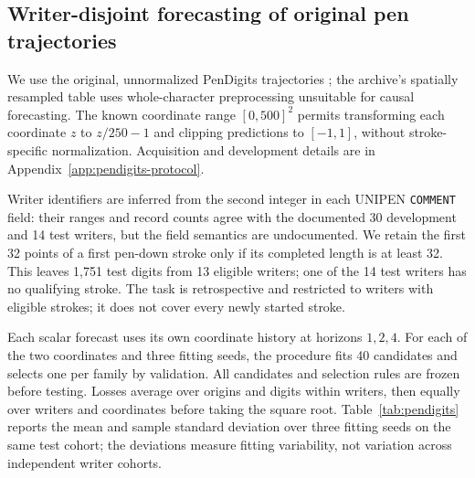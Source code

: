 \subsection{Writer-disjoint forecasting of original pen trajectories}
\label{sec:pendigits}

We use the original, unnormalized PenDigits trajectories
\citep{alpaydin1996pendigits}; the archive's spatially resampled table uses
whole-character preprocessing unsuitable for causal forecasting. The known
coordinate range $[0,500]^2$ permits transforming each coordinate $z$ to
$z/250-1$ and clipping predictions to $[-1,1]$, without stroke-specific normalization.
Acquisition and development details are in Appendix~\ref{app:pendigits-protocol}.

Writer identifiers are inferred from the second integer in each UNIPEN
\texttt{COMMENT} field: their ranges and record counts agree with the
documented 30 development and 14 test writers, but the field semantics are
undocumented. We retain the first 32 points of a first pen-down stroke only
if its completed length is at least 32. This leaves 1,751 test digits from
13 eligible writers; one of the 14 test writers has no qualifying stroke.
The task is retrospective and restricted to writers with eligible strokes;
it does not cover every newly started stroke.

Each scalar forecast uses its own coordinate history at horizons $1,2,4$.
For each of the two coordinates and three fitting seeds, the procedure fits
40 candidates and selects one per family by validation. All candidates and
selection rules are frozen before testing. Losses average over origins and
digits within writers, then equally over writers and coordinates before
taking the square root. Table~\ref{tab:pendigits} reports the mean and sample
standard deviation over three fitting seeds on the same test cohort;
the deviations measure fitting variability, not variation across independent
writer cohorts.

